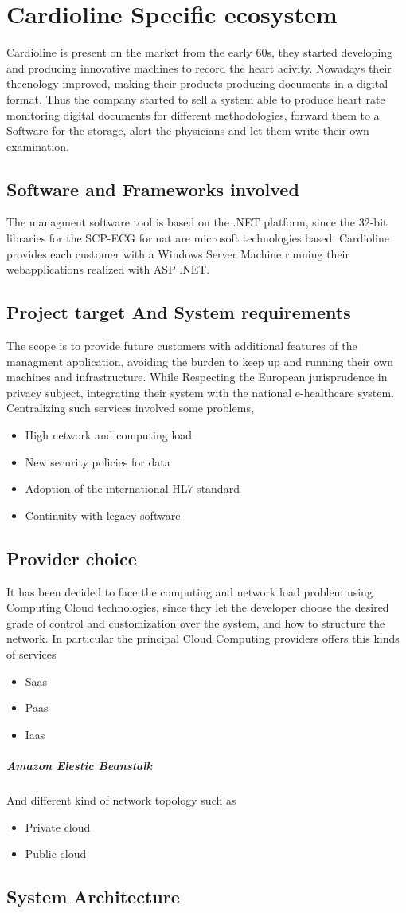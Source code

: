 \chapter{Cardioline Specific ecosystem}
Cardioline is present on the market from the early 60s, they started developing and producing innovative machines to record the heart acivity. Nowadays their thecnology improved, making their products producing documents in a digital format.
Thus the company started to sell a system able to produce heart rate monitoring digital documents for different methodologies, forward them to a Software for the storage, alert the physicians and let them write their own examination.
\section{Software and Frameworks involved}
The managment software tool is based on the .NET platform, since the 32-bit libraries for the SCP-ECG format are microsoft technologies based.
Cardioline provides each customer with a Windows Server Machine running their webapplications realized with ASP .NET.
\section{Project target And System requirements}
The scope is to provide future customers with additional features of the managment application, avoiding the burden to keep up and running their own machines and infrastructure.
While Respecting the European jurisprudence in privacy subject, integrating their system with the national e-healthcare system.
Centralizing such services involved some problems,
\begin{itemize}
    \item High network and computing load
    \item New security policies for data
    \item Adoption of the international HL7 standard
    \item Continuity with legacy software
\end{itemize}
\section{Provider choice}
It has been decided to face the computing and network load problem using Computing Cloud technologies, since they let the developer choose the desired grade of control and customization over the system, and how to structure the network.
In particular the principal Cloud Computing providers offers this kinds of services
\begin{itemize}
    \item Saas
    \item Paas
    \item Iaas
\end{itemize}
\paragraph{Amazon Elestic Beanstalk}
And different kind of network topology such as
\begin{itemize}
    \item Private cloud
    \item Public cloud
\end{itemize}

\section{System Architecture}
